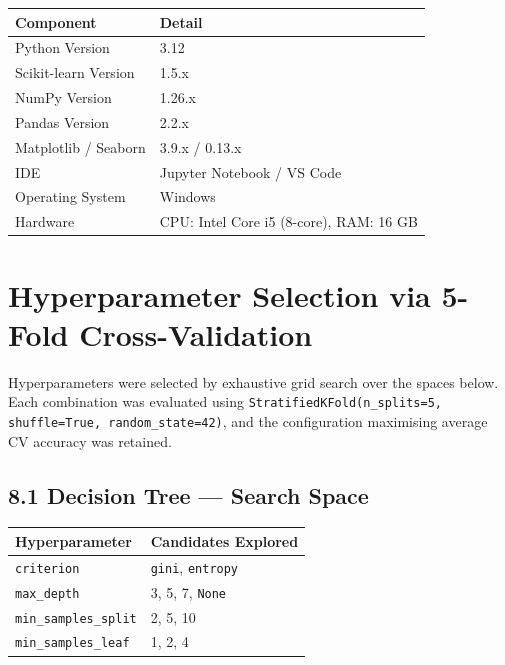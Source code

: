 \documentclass[12pt,a4paper]{article}
\begin{document}
\begin{tabular}{ll}
\toprule
\textbf{Component}     & \textbf{Detail} \\
\midrule
Python Version         & 3.12 \\
Scikit-learn Version   & 1.5.x \\
NumPy Version          & 1.26.x \\
Pandas Version         & 2.2.x \\
Matplotlib / Seaborn   & 3.9.x / 0.13.x \\
IDE                    & Jupyter Notebook / VS Code \\
Operating System       & Windows \\
Hardware               & CPU: Intel Core i5 (8-core), RAM: 16 GB \\
\bottomrule
\end{tabular}

\section{Hyperparameter Selection via 5-Fold Cross-Validation}

Hyperparameters were selected by exhaustive grid search over the spaces below.
Each combination was evaluated using \texttt{StratifiedKFold(n\_splits=5, shuffle=True, random\_state=42)},
and the configuration maximising average CV accuracy was retained.

\subsection*{8.1 Decision Tree — Search Space}

\begin{center}
\begin{tabular}{ll}
\toprule
\textbf{Hyperparameter}  & \textbf{Candidates Explored} \\
\midrule
\texttt{criterion}         & \texttt{gini}, \texttt{entropy} \\
\texttt{max\_depth}        & 3, 5, 7, \texttt{None} \\
\texttt{min\_samples\_split} & 2, 5, 10 \\
\texttt{min\_samples\_leaf}  & 1, 2, 4 \\
\bottomrule
\end{tabular}
\end{center}
\end{document}
